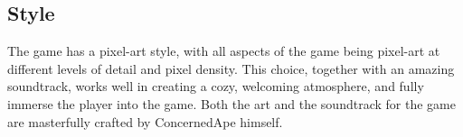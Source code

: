 \documentclass[a4paper,10pt,english]{article}
\newcommand{\ph}[1]{\textit{[#1]}}
\begin{document}
\subsection*{Style}

The game has a pixel-art style, with all aspects of the game being pixel-art at different levels of detail and pixel density. This choice, together with an amazing soundtrack, works well in creating a cozy, welcoming atmosphere, and fully immerse the player into the game. Both the art and the soundtrack for the game are masterfully crafted by ConcernedApe himself. 










\end{document}
